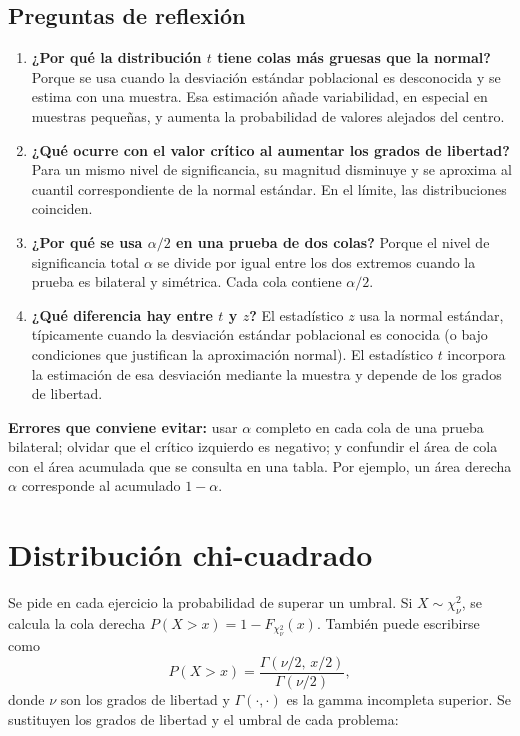 \documentclass[11pt]{article}
\begin{document}
\subsection{Preguntas de reflexión}
\begin{enumerate}
  \item \textbf{¿Por qué la distribución $t$ tiene colas más gruesas que la normal?} Porque se usa cuando la desviación estándar poblacional es desconocida y se estima con una muestra. Esa estimación añade variabilidad, en especial en muestras pequeñas, y aumenta la probabilidad de valores alejados del centro.
  \item \textbf{¿Qué ocurre con el valor crítico al aumentar los grados de libertad?} Para un mismo nivel de significancia, su magnitud disminuye y se aproxima al cuantil correspondiente de la normal estándar. En el límite, las distribuciones coinciden.
  \item \textbf{¿Por qué se usa $\alpha/2$ en una prueba de dos colas?} Porque el nivel de significancia total $\alpha$ se divide por igual entre los dos extremos cuando la prueba es bilateral y simétrica. Cada cola contiene $\alpha/2$.
  \item \textbf{¿Qué diferencia hay entre $t$ y $z$?} El estadístico $z$ usa la normal estándar, típicamente cuando la desviación estándar poblacional es conocida (o bajo condiciones que justifican la aproximación normal). El estadístico $t$ incorpora la estimación de esa desviación mediante la muestra y depende de los grados de libertad.
\end{enumerate}

\textbf{Errores que conviene evitar:} usar $\alpha$ completo en cada cola de una prueba bilateral; olvidar que el crítico izquierdo es negativo; y confundir el área de cola con el área acumulada que se consulta en una tabla. Por ejemplo, un área derecha $\alpha$ corresponde al acumulado $1-\alpha$.

\section{Distribución chi-cuadrado}

Se pide en cada ejercicio la probabilidad de superar un umbral. Si $X\sim\chi^2_{\nu}$, se calcula la cola derecha $P(X>x)=1-F_{\chi^2_\nu}(x)$. También puede escribirse como
\[
P(X>x)=\frac{\Gamma(\nu/2,\,x/2)}{\Gamma(\nu/2)},
\]
donde $\nu$ son los grados de libertad y $\Gamma(\cdot,\cdot)$ es la gamma incompleta superior. Se sustituyen los grados de libertad y el umbral de cada problema:
\end{document}
